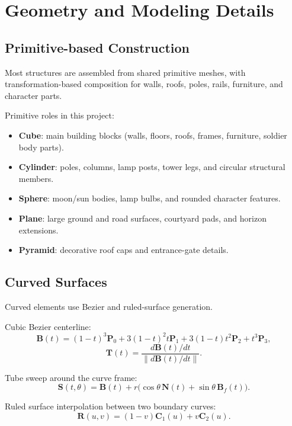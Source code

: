 \documentclass{article}
\begin{document}
\section{Geometry and Modeling Details}
\subsection{Primitive-based Construction}
Most structures are assembled from shared primitive meshes, with transformation-based composition for walls, roofs, poles, rails, furniture, and character parts.

Primitive roles in this project:
\begin{itemize}
    \item \textbf{Cube}: main building blocks (walls, floors, roofs, frames, furniture, soldier body parts).
    \item \textbf{Cylinder}: poles, columns, lamp posts, tower legs, and circular structural members.
    \item \textbf{Sphere}: moon/sun bodies, lamp bulbs, and rounded character features.
    \item \textbf{Plane}: large ground and road surfaces, courtyard pads, and horizon extensions.
    \item \textbf{Pyramid}: decorative roof caps and entrance-gate details.
\end{itemize}

\subsection{Curved Surfaces}
Curved elements use Bezier and ruled-surface generation.

Cubic Bezier centerline:
\begin{equation}
\mathbf{B}(t) = (1-t)^3\mathbf{P}_0 + 3(1-t)^2t\mathbf{P}_1 + 3(1-t)t^2\mathbf{P}_2 + t^3\mathbf{P}_3,
\end{equation}
\begin{equation}
\mathbf{T}(t) = \frac{d\mathbf{B}(t)/dt}{\|d\mathbf{B}(t)/dt\|}.
\end{equation}

Tube sweep around the curve frame:
\begin{equation}
\mathbf{S}(t,\theta) = \mathbf{B}(t) + r\big(\cos\theta\,\mathbf{N}(t) + \sin\theta\,\mathbf{B}_f(t)\big).
\end{equation}

Ruled surface interpolation between two boundary curves:
\begin{equation}
\mathbf{R}(u,v) = (1-v)\mathbf{C}_1(u) + v\mathbf{C}_2(u).
\end{equation}
\end{document}
